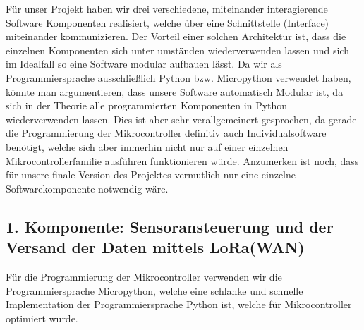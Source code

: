 Für unser Projekt haben wir drei verschiedene, miteinander interagierende Software Komponenten realisiert, welche über eine Schnittstelle (Interface) miteinander kommunizieren. 
Der Vorteil einer solchen Architektur ist, dass die einzelnen Komponenten sich unter umständen wiederverwenden lassen und sich im Idealfall so eine Software modular aufbauen lässt.
Da wir als Programmiersprache ausschließlich Python bzw. Micropython verwendet haben, könnte man argumentieren, dass unsere Software automatisch Modular ist, da sich in der Theorie alle programmierten Komponenten in Python wiederverwenden lassen.
Dies ist aber sehr verallgemeinert gesprochen, da gerade die Programmierung der Mikrocontroller definitiv auch Individualsoftware benötigt, welche sich aber immerhin nicht nur auf einer einzelnen Mikrocontrollerfamilie ausführen funktionieren würde.
Anzumerken ist noch, dass für unsere finale Version des Projektes vermutlich nur eine einzelne Softwarekomponente notwendig wäre.


\subsection{1. Komponente: Sensoransteuerung und der Versand der Daten mittels LoRa(WAN)} \label{Sender}

Für die Programmierung der Mikrocontroller verwenden wir die Programmiersprache Micropython, welche eine schlanke und schnelle Implementation der Programmiersprache Python ist, welche für Mikrocontroller optimiert wurde.

